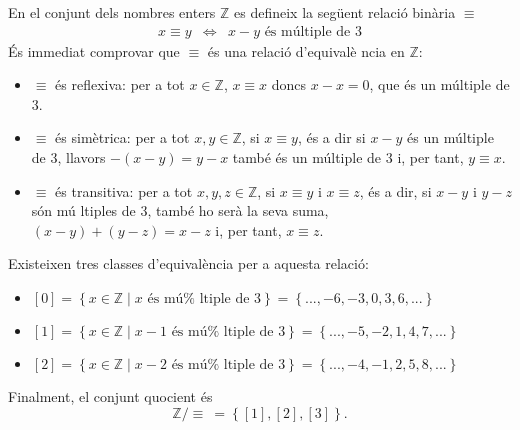 \begin{exemple}
En el conjunt dels nombres enters $\mathbb{Z}$ es defineix la seg\"{u}ent
relaci\'{o} bin\`{a}ria $\equiv$%
\begin{equation*}
\begin{array}{ccc}
x\equiv y & \Longleftrightarrow & x-y\text{ \'{e}s m\'{u}ltiple de }3%
\end{array}
\end{equation*}
\'{E}s immediat comprovar que $\equiv$ \'{e}s una relaci\'{o} d'equival\`{e}%
ncia en $\mathbb{Z}$:

\begin{itemize}
\item $\equiv$ \'{e}s reflexiva: per a tot $x\in\mathbb{Z}$, $x\equiv x$
doncs $x-x=0$, que \'{e}s un m\'{u}ltiple de $3$.

\item $\equiv$ \'{e}s sim\`{e}trica: per a tot $x,y\in\mathbb{Z}$, si $%
x\equiv y$, \'{e}s a dir si $x-y$ \'{e}s un m\'{u}ltiple de $3$, llavors $%
-(x-y)=y-x$ tamb\'{e} \'{e}s un m\'{u}ltiple de $3$ i, per tant, $y\equiv x$.

\item $\equiv$ \'{e}s transitiva: per a tot $x,y,z\in\mathbb{Z}$, si $%
x\equiv y$ i $x\equiv z$, \'{e}s a dir, si $x-y$ i $y-z$ s\'{o}n m\'{u}%
ltiples de $3$, tamb\'{e} ho ser\`{a} la seva suma, $(x-y)+(y-z)=x-z$ i, per
tant, $x\equiv z$.
\end{itemize}

Existeixen tres classes d'equival\`{e}ncia per a aquesta relaci\'{o}:

\begin{itemize}
\item $\left[ 0\right] =\left\{ x\in\mathbb{Z}\mid x\text{ \'{e}s m\'{u}%
ltiple de }3\right\} =\left\{ ...,-6,-3,0,3,6,...\right\} $

\item $\left[ 1\right] =\left\{ x\in\mathbb{Z}\mid x-1\text{ \'{e}s m\'{u}%
ltiple de }3\right\} =\left\{ ...,-5,-2,1,4,7,...\right\} $

\item $\left[ 2\right] =\left\{ x\in\mathbb{Z}\mid x-2\text{ \'{e}s m\'{u}%
ltiple de }3\right\} =\left\{ ...,-4,-1,2,5,8,...\right\} $
\end{itemize}

Finalment, el conjunt quocient \'{e}s%
\begin{equation*}
\mathbb{Z}/\equiv~=\left\{ \left[ 1\right] ,\left[ 2\right] ,\left[ 3\right]
\right\} \text{.}
\end{equation*}
\end{exemple}

